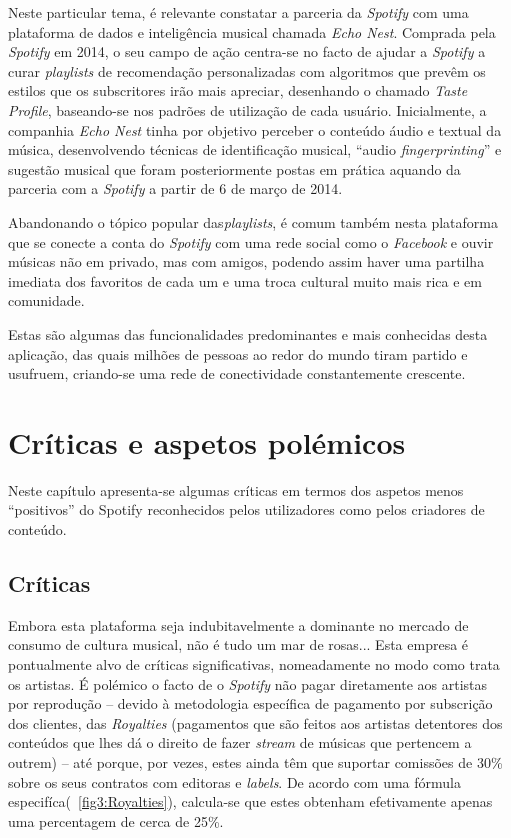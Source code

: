 \documentclass{report}
\begin{document}
 Neste particular tema, é relevante constatar a parceria da \textit{Spotify} com uma plataforma de dados e inteligência musical chamada \textit{Echo Nest}. Comprada pela \textit{Spotify} em 2014, o seu campo de ação centra-se no facto de ajudar a \textit{Spotify} a curar \textit{playlists} de recomendação personalizadas com algoritmos que prevêm os estilos que os subscritores irão mais apreciar, desenhando o chamado \textit{Taste Profile}, baseando-se nos padrões de utilização de cada usuário. Inicialmente, a companhia \textit{Echo Nest} tinha por objetivo perceber o conteúdo áudio e textual da música, desenvolvendo técnicas de identificação musical, “audio \textit{fingerprinting}” e sugestão musical que foram posteriormente postas em prática aquando da parceria com a \textit{Spotify} a partir de 6 de março de 2014.

Abandonando o tópico popular das\textit{playlists}, é comum também nesta plataforma que se conecte a conta do \textit{Spotify} com uma rede social como o \textit{Facebook} e ouvir músicas não em privado, mas com amigos, podendo assim haver uma partilha imediata dos favoritos de cada um e uma troca cultural muito mais rica e em comunidade.

Estas são algumas das funcionalidades predominantes e mais conhecidas desta aplicação, das quais milhões de pessoas ao redor do mundo tiram partido e usufruem, criando-se uma rede de conectividade constantemente crescente.


\chapter{Críticas e aspetos polémicos}
\label{chap. Críticas e aspetos polémicos}


Neste capítulo apresenta-se algumas críticas em termos dos aspetos menos ``positivos'' do Spotify reconhecidos pelos utilizadores como pelos criadores de conteúdo.

\section{Críticas}
Embora esta plataforma seja indubitavelmente a dominante no mercado de consumo de cultura musical, não é tudo um mar de rosas... Esta empresa é pontualmente alvo de críticas significativas, nomeadamente no modo como trata os artistas. É polémico o facto de o \textit{Spotify} não pagar diretamente aos artistas por reprodução – devido à metodologia específica de pagamento por subscrição dos clientes, das \textit{Royalties} (pagamentos que são feitos aos artistas detentores dos conteúdos que lhes dá o direito de fazer \textit{stream} de músicas que pertencem a outrem) – até porque, por vezes, estes ainda têm que suportar comissões de 30\% sobre os seus contratos com editoras e \textit{labels}. De acordo com uma fórmula especifíca(~\ref{fig3:Royalties}), calcula-se que estes obtenham efetivamente apenas uma percentagem de cerca de 25\%.
\end{document}
